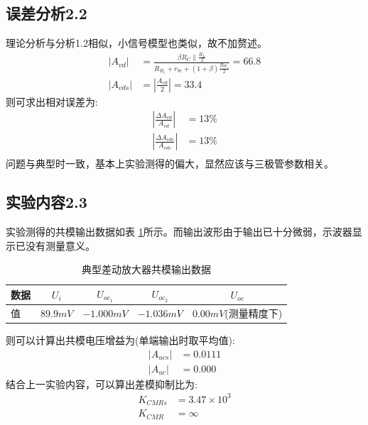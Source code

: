 \documentclass[a4paper,11pt,UTF8]{ctexart}
\begin{document}
\subsection{误差分析2.2}
理论分析与分析1.2相似，小信号模型也类似，故不加赘述。
\begin{equation}
  \begin{aligned}
    \left | A_{vd}\right |&=\frac{\beta R_C\parallel\frac{R_L}{2}}{R_{B_1}+r_{be}+(1+\beta)\frac{R_{W_1}}{2}}=66.8\\
    \left | A_{vds}\right |&=\left |\frac{A_{vd}}{2}\right |=33.4
  \end{aligned}
\end{equation}
则可求出相对误差为:
\begin{equation}
  \begin{aligned}
    \left |\frac{\Delta A_{vd}}{A_{vd}}\right |&=13\%\\
      \left |\frac{\Delta A_{vds}}{A_{vds}}\right |&=13\%\\
  \end{aligned}
\end{equation}
问题与典型时一致，基本上实验测得的偏大，显然应该与三极管参数相关。
\subsection{实验内容2.3}
实验测得的共模输出数据如表 \ref{tab:ncTab}所示。而输出波形由于输出已十分微弱，示波器显示已没有测量意义。

\begin{table}[!h!tbp]
  \caption{典型差动放大器共模输出数据}\label{tab:ncTab}
    \centering
    \begin{tabular}{|l|c|c|c|c|}
    \hline
    数据 &$U_{i}$&$U_{oc_1}$&$U_{oc_2}$&$U_{oc}$         \\ \hline
    值   &$89.9mV$&$-1.000mV$&$-1.036mV$&$0.00mV$(测量精度下)     \\ \hline
  \end{tabular}
  \end{table}
则可以计算出共模电压增益为(单端输出时取平均值):
\begin{equation}
  \begin{aligned}
    \left | A_{ucs}\right |&=0.0111\\
    \left | A_{uc}\right |&=0.000
  \end{aligned}
\end{equation}
结合上一实验内容，可以算出差模抑制比为:
\begin{equation}
  \begin{aligned}
    K_{CMRs}&=3.47\times10^3\\
    K_{CMR}&=\infty
  \end{aligned}
\end{equation}
\end{document}
